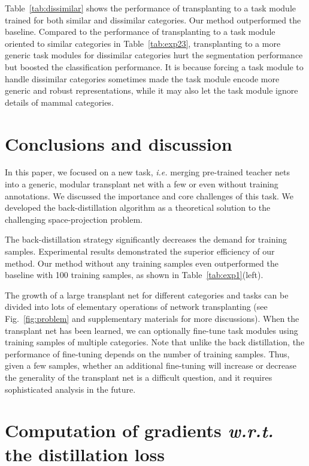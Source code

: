 \documentclass[10pt,twocolumn,letterpaper]{article}
\begin{document}
Table~\ref{tab:dissimilar} shows the performance of transplanting to a task module trained for both similar and dissimilar categories. Our method outperformed the baseline. Compared to the performance of transplanting to a task module oriented to similar categories in Table~\ref{tab:exp23}, transplanting to a more generic task modules for dissimilar categories hurt the segmentation performance but boosted the classification performance. It is because forcing a task module to handle dissimilar categories sometimes made the task module encode more generic and robust representations, while it may also let the task module ignore details of mammal categories.

\section{Conclusions and discussion}

In this paper, we focused on a new task, \emph{i.e.} merging pre-trained teacher nets into a generic, modular transplant net with a few or even without training annotations. We discussed the importance and core challenges of this task. We developed the back-distillation algorithm as a theoretical solution to the challenging space-projection problem.

The back-distillation strategy significantly decreases the demand for training samples. Experimental results demonstrated the superior efficiency of our method. Our method without any training samples even outperformed the baseline with 100 training samples, as shown in Table~\ref{tab:exp1}(left).



The growth of a large transplant net for different categories and tasks can be divided into lots of elementary operations of network transplanting (see Fig.~\ref{fig:problem} and supplementary materials for more discussions). When the transplant net has been learned, we can optionally fine-tune task modules using training samples of multiple categories. Note that unlike the back distillation, the performance of fine-tuning depends on the number of training samples. Thus, given a few samples, whether an additional fine-tuning will increase or decrease the generality of the transplant net is a difficult question, and it requires sophisticated analysis in the future.


{\small


}

\newpage
\onecolumn
\appendix
\section*{Computation of gradients \emph{w.r.t.} the distillation loss}
\end{document}
